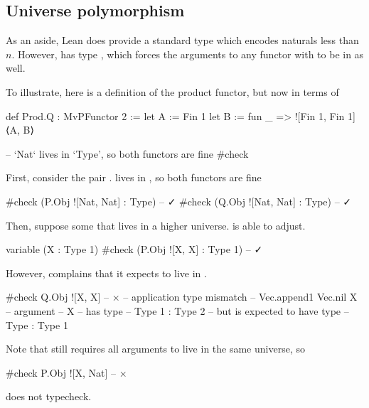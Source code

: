\documentclass[titlepage]{report}
\begin{document}
\subsection*{Universe polymorphism}

As an aside, Lean does provide a standard  type which encodes naturals less than $n$.
However,  has type , which forces the arguments to any functor  with
 to be in  as well.

To illustrate, here is a definition of the product functor, but now in terms of 
\begin{leancode}
    def Prod.Q : MvPFunctor 2 
      :=  let A := Fin 1
          let B := fun _ => ![Fin 1, Fin 1]
          ⟨A, B⟩

    -- `Nat` lives in `Type', so both functors are fine
    #check  
\end{leancode}
First, consider the pair .  lives in , so both functors are 
fine
\begin{leancode}
    #check (P.Obj ![Nat, Nat] : Type)       -- ✓
    #check (Q.Obj ![Nat, Nat] : Type)       -- ✓
\end{leancode}
Then, suppose some  that lives in a higher universe.
 is able to adjust. 
\begin{leancode}
    variable (X : Type 1)
    #check (P.Obj ![X, X] : Type 1)         -- ✓
\end{leancode}
However,  complains that it expects  to live in .
\begin{leancode}    
    #check Q.Obj ![X, X]                    -- ×            
    -- application type mismatch
    --   Vec.append1 Vec.nil X
    -- argument
    --   X
    -- has type
    --   Type 1 : Type 2
    -- but is expected to have type
    --   Type : Type 1
\end{leancode}

Note that  still requires all arguments to live in the same universe, so
\begin{leancode}
    #check P.Obj ![X, Nat]                  -- ×
\end{leancode}
does not typecheck.
\end{document}
